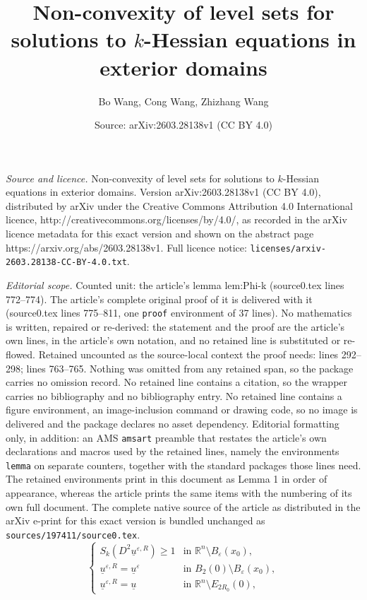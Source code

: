 \documentclass[10pt,a4paper]{amsart}
\title{Non-convexity of level sets for solutions to $k$-Hessian equations in exterior domains}
\author{Bo Wang, Cong Wang, Zhizhang Wang}
\date{Source: arXiv:2603.28138v1 (CC BY 4.0)}
\begin{document}
\maketitle

\noindent\emph{Source and licence.} Non-convexity of level sets for solutions to $k$-Hessian equations in exterior domains. Version arXiv:2603.28138v1 (CC BY 4.0), distributed by arXiv under the Creative Commons Attribution 4.0 International licence, http://creativecommons.org/licenses/by/4.0/, as recorded in the arXiv licence metadata for this exact version and shown on the abstract page https://arxiv.org/abs/2603.28138v1. Full licence notice: \texttt{licenses/arxiv-2603.28138-CC-BY-4.0.txt}.\par\smallskip

\noindent\textit{Editorial scope.} Counted unit: the article's lemma lem:Phi-k (source0.tex lines 772--774). The article's complete original proof of it is delivered with it (source0.tex lines 775--811, one \texttt{proof} environment of 37 lines). No mathematics is written, repaired or re-derived: the statement and the proof are the article's own lines, in the article's own notation, and no retained line is substituted or re-flowed.  Retained uncounted as the source-local context the proof needs: lines 292--298; lines 763--765.  Nothing was omitted from any retained span, so the package carries no omission record.  No retained line contains a citation, so the wrapper carries no bibliography and no bibliography entry.  No retained line contains a figure environment, an image-inclusion command or drawing code, so no image is delivered and the package declares no asset dependency.  Editorial formatting only, in addition: an AMS \texttt{amsart} preamble that restates the article's own declarations and macros used by the retained lines, namely the environments \texttt{lemma} on separate counters, together with the standard packages those lines need.  The retained environments print in this document as Lemma 1 in order of appearance, whereas the article prints the same items with the numbering of its own full document.  The complete native source of the article as distributed in the arXiv e-print for this exact version is bundled unchanged as \texttt{sources/197411/source0.tex}.
	\begin{equation}\label{eq:subsol}
		\begin{cases}
			S_k(D^2\underline{u}^{\varepsilon,R})\geq 1 & \text{in }\mathbb{R}^n\setminus B_\varepsilon(x_0), \\
			\underline{u}^{\varepsilon,R}=\underline{u}^{\varepsilon} & \text{in }B_2(0)\setminus B_\varepsilon(x_0), \\
			\underline{u}^{\varepsilon,R}=\underline{u} & \text{in }\mathbb{R}^n\setminus E_{2R_0}(0),
		\end{cases}
	\end{equation}
\end{document}
